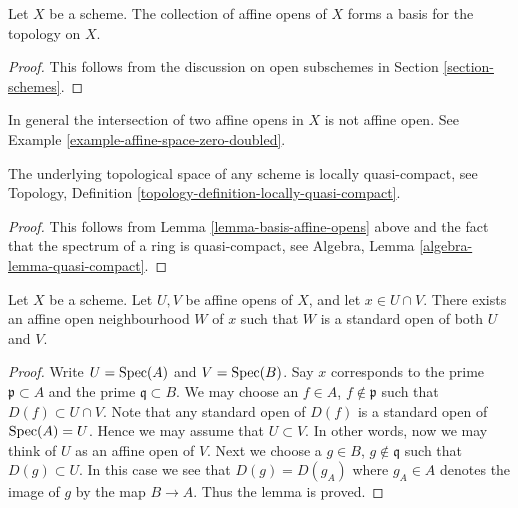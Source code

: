 \begin{lemma}
\label{lemma-basis-affine-opens}
Let $X$ be a scheme. The collection of affine opens
of $X$ forms a basis for the topology on $X$.
\end{lemma}

\begin{proof}
This follows from the discussion on open subschemes
in Section \ref{section-schemes}.
\end{proof}

\begin{remark}
\label{remark-intersection-affine-opens}
In general the intersection of two affine opens in $X$
is not affine open. See Example \ref{example-affine-space-zero-doubled}.
\end{remark}

\begin{lemma}
\label{lemma-locally-quasi-compact}
The underlying topological space of any scheme is
locally quasi-compact, see
Topology, Definition \ref{topology-definition-locally-quasi-compact}.
\end{lemma}

\begin{proof}
This follows from Lemma \ref{lemma-basis-affine-opens} above
and the fact that the spectrum of a ring is quasi-compact, see
Algebra, Lemma \ref{algebra-lemma-quasi-compact}.
\end{proof}

\begin{lemma}
\label{lemma-standard-open-two-affines}
Let $X$ be a scheme.
Let $U, V$ be affine opens of $X$, and let $x \in U \cap V$.
There exists an affine open neighbourhood $W$ of $x$
such that $W$ is a standard open of both $U$ and $V$.
\end{lemma}

\begin{proof}
Write $U = \mathop{\mathrm{Spec}}(A)$ and $V = \mathop{\mathrm{Spec}}(B)$.
Say $x$ corresponds to the prime $\mathfrak p \subset A$
and the prime $\mathfrak q \subset B$.
We may choose an $f \in A$, $f \not \in \mathfrak p$ such that
$D(f) \subset U \cap V$. Note that any standard open of $D(f)$
is a standard open of $\mathop{\mathrm{Spec}}(A) = U$. Hence we may assume
that $U \subset V$. In other words, now we may think of $U$
as an affine open of $V$. Next we choose a
$g \in B$, $g \not \in \mathfrak q$ such that
$D(g) \subset U$. In this case we see that $D(g) = D(g_A)$
where $g_A \in A$ denotes the image of $g$ by the map $B \to A$.
Thus the lemma is proved.
\end{proof}

